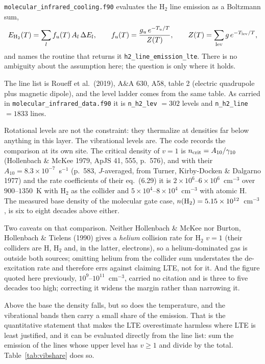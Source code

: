 \documentclass[english,a4paper]{my_memo}
\begin{document}
\label{sec:ir}

\texttt{molecular\_infrared\_cooling.f90} evaluates the H$_2$ line emission
as a Boltzmann sum,
%
\begin{equation}
  E_{\rm H_2}(T) = \sum_l f_u(T)\, A_l\, \Delta E_l ,
  \qquad
  f_u(T) = \frac{g_u\,e^{-T_u/T}}{Z(T)},
  \qquad
  Z(T) = \sum_{\rm lev} g\, e^{-T_{\rm lev}/T},
\end{equation}
%
and names the routine that returns it \texttt{h2\_line\_emission\_lte}. There
is no ambiguity about the assumption here; the question is only where it
holds.

The line list is Roueff et al.\ (2019), A\&A 630, A58, table 2 (electric
quadrupole plus magnetic dipole), and the level ladder comes from the same
table. As carried in \texttt{molecular\_infrared\_data.f90} it is
\texttt{n\_h2\_lev} $= 302$ levels and \texttt{n\_h2\_line} $= 1833$ lines.

Rotational levels are not the constraint: they thermalize at densities far
below anything in this layer. The vibrational levels are. The code records the
comparison at its own site. The critical density of $v=1$ is
$n_{\rm crit} = A_{10}/\gamma_{10}$ (Hollenbach \& McKee 1979, ApJS 41, 555,
p.~576), and with their $A_{10} = 8.3\times10^{-7}$~s$^{-1}$ (p.~583,
$J$-averaged, from Turner, Kirby-Docken \& Dalgarno 1977) and the rate
coefficients of their eq.~(6.29) it is $2\times10^{6}$--$6\times10^{6}$~cm$^{-3}$
over $900$--$1350$~K with H$_2$ as the collider and
$5\times10^{4}$--$8\times10^{4}$~cm$^{-3}$ with atomic H. The measured base
density of the molecular gate case, $n({\rm H_2}) = 5.15\times10^{12}$~cm$^{-3}$,
is six to eight decades above either.

Two caveats on that comparison. Neither Hollenbach \& McKee nor Burton,
Hollenbach \& Tielens (1990) gives a \emph{helium} collision rate for
H$_2$ $v=1$ (their colliders are H, H$_2$ and, in the latter, electrons),
so a helium-dominated gas is outside both sources; omitting helium from the
collider sum understates the de-excitation rate and therefore errs against
claiming LTE, not for it. And the figure quoted here previously,
$10^{9}$--$10^{11}$~cm$^{-3}$, carried no citation and is three to five
decades too high; correcting it widens the margin rather than narrowing it.

Above the base the density falls, but so does the temperature, and the
vibrational bands then carry a small share of the emission. That is the
quantitative statement that makes the LTE overestimate harmless where LTE is
least justified, and it can be evaluated directly from the line list: sum the
emission of the lines whose upper level has $v \geq 1$ and divide by the
total. Table~\ref{tab:vibshare} does so.
\end{document}
